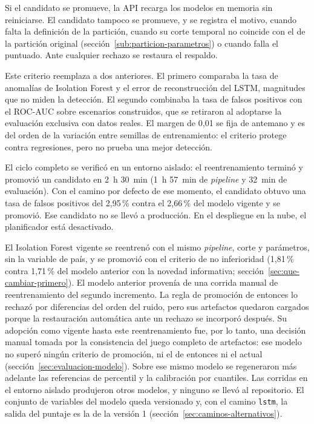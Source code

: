 Si el candidato se promueve, la API recarga los modelos en memoria sin reiniciarse. El candidato tampoco se promueve, y se registra el motivo, cuando falta la definición de la partición, cuando su corte temporal no coincide con el de la partición original (sección~\ref{sub:particion-parametros}) o cuando falla el puntuado. Ante cualquier rechazo se restaura el respaldo.

Este criterio reemplaza a dos anteriores. El primero comparaba la tasa de anomalías de Isolation Forest y el error de reconstrucción del LSTM, magnitudes que no miden la detección. El segundo combinaba la tasa de falsos positivos con el ROC-AUC sobre escenarios construidos, que se retiraron al adoptarse la evaluación exclusiva con datos reales. El margen de 0,01 se fija de antemano y es del orden de la variación entre semillas de entrenamiento: el criterio protege contra regresiones, pero no prueba una mejor detección.

El ciclo completo se verificó en un entorno aislado: el reentrenamiento terminó y promovió un candidato en 2~h 30~min (1~h 57~min de \emph{pipeline} y 32~min de evaluación). Con el camino por defecto de ese momento, el candidato obtuvo una tasa de falsos positivos del 2,95\,\% contra el 2,66\,\% del modelo vigente y se promovió. Ese candidato no se llevó a producción. En el despliegue en la nube, el planificador está desactivado.

El Isolation Forest vigente se reentrenó con el mismo \emph{pipeline}, corte y parámetros, sin la variable de país, y se promovió con el criterio de no inferioridad (1,81\,\% contra 1,71\,\% del modelo anterior con la novedad informativa; sección~\ref{sec:que-cambiar-primero}). El modelo anterior provenía de una corrida manual de reentrenamiento del segundo incremento. La regla de promoción de entonces lo rechazó por diferencias del orden del ruido, pero sus artefactos quedaron cargados porque la restauración automática ante un rechazo se incorporó después. Su adopción como vigente hasta este reentrenamiento fue, por lo tanto, una decisión manual tomada por la consistencia del juego completo de artefactos: ese modelo no superó ningún criterio de promoción, ni el de entonces ni el actual (sección~\ref{sec:evaluacion-modelo}). Sobre ese mismo modelo se regeneraron más adelante las referencias de percentil y la calibración por cuantiles. Las corridas en el entorno aislado produjeron otros modelos, y ninguno se llevó al repositorio. El conjunto de variables del modelo queda versionado y, con el camino \texttt{lstm}, la salida del puntaje es la de la versión 1 (sección~\ref{sec:caminos-alternativos}).

